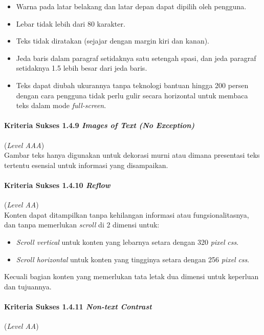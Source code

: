 \begin{itemize}
	\item Warna pada latar belakang dan latar depan dapat dipilih oleh pengguna.
	\item Lebar tidak lebih dari 80 karakter.
	\item Teks tidak diratakan (sejajar dengan margin kiri dan kanan).
	\item Jeda baris dalam paragraf setidaknya satu setengah spasi, dan jeda paragraf setidaknya 1.5 lebih besar dari jeda baris.
	\item Teks dapat diubah ukurannya tanpa teknologi bantuan hingga 200 persen dengan cara pengguna tidak perlu gulir secara horizontal untuk membaca teks dalam mode \textit{full-screen}.
\end{itemize}

\paragraph{Kriteria Sukses 1.4.9 \textit{Images of Text (No Exception)}}
\label{subsec:kriteria_1.4.9}
(\textit{Level AAA}) \\

Gambar teks hanya digunakan untuk dekorasi murni atau dimana presentasi teks tertentu esensial untuk informasi yang disampaikan. 

\paragraph{Kriteria Sukses 1.4.10 \textit{Reflow}}
\label{subsec:kriteria_1.4.10}
(\textit{Level AA}) \\

Konten dapat ditampilkan tanpa kehilangan informasi atau fungsionalitasnya, dan tanpa memerlukan \textit{scroll} di 2 dimensi untuk:

\begin{itemize}
	\item \textit{Scroll vertical} untuk konten yang lebarnya setara dengan 320 \textit{pixel} \textit{css}.
	\item \textit{Scroll horizontal} untuk konten yang tingginya setara dengan 256 \textit{pixel} \textit{css}.
\end{itemize}

Kecuali bagian konten yang memerlukan tata letak dua dimensi untuk keperluan dan tujuannya.

\paragraph{Kriteria Sukses 1.4.11 \textit{Non-text Contrast}}
\label{subsec:kriteria_1.4.11}
(\textit{Level AA}) \\

